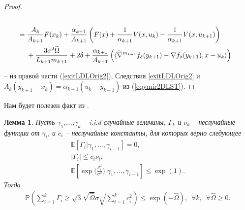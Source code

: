 \documentclass[11pt,a4]{article}
\newtheorem{lemma}{Лемма}
\newcommand\abs[1]{\left|#1\right|}
\newcommand*\circled[1]{\tikz[baseline=(char.base)]{
		\node[shape=circle,draw,inner sep=2pt] (char) {#1};}}
\begin{document}
\begin{proof}
\begin{align*}
	 \\&=
	 	 \frac{A_k}{A_{k+1}}F(x_k) + \frac{\alpha_{k+1}}{A_{k+1}}\left(F(x) + \frac{1}{\alpha_{k+1}}V(x, u_k) - \frac{1}{\alpha_{k+1}}V(x, u_{k+1})\right) \\&\hphantom{{}={}}+ \frac{3\sigma^2\widetilde{\Omega}}{L_{k+1}m_{k+1}} + 2\delta +\frac{\alpha_{k+1}}{A_{k+1}}\left(\langle \widetilde{\nabla}^{m_{k+1}} f_\delta(y_{k+1})-\nabla f_\delta(y_{k+1}), x - u_{k} \rangle\right)
\end{align*}

{\small \circled{1}} -- из правой части (\ref{exitLDLOrig2}), Следствия \ref{exitLDLOrig2} и $A_{k}(y_{k+1} - x_k) = \alpha_{k+1} (u_k - y_{k+1})$ из (\ref{eqymir2DLST}).

\end{proof}

Нам будет полезен факт из \cite{lan2012validation, devolder2013exactness}.
\begin{lemma}
\label{lemmaDev}
Пусть $\gamma_1$,...,$\gamma_k$ -- i.i.d случайные величины, $\Gamma_k$ и $\nu_k$ -- неслучайные функции от $\gamma_i$, и $c_i$ -- неслучайные константы, для которых верно следующее
\begin{gather*}
\mathbb{E}\left[\Gamma_i|\gamma_1,\dots,\gamma_{i-1}\right] = 0,\\
\abs{\Gamma_i} \leq c_i \nu_i,\\
\mathbb{E}\left[\exp\Bigg(\frac{\nu_i^2}{\sigma^2}\Bigg)\Bigg|\gamma_1,\dots,\gamma_{i-1}\right] \leq \exp(1).
\end{gather*}
Тогда
\begin{gather*}
\mathbb{P}\left(\sum_{i=1}^{k}\Gamma_i \geq \sqrt{3}\sqrt{\widehat{\Omega}}\sigma\sqrt{\sum_{i=1}^{k}c_i^2}\right) \leq \exp(-\widehat{\Omega}),\,\,\,\forall k,\,\,\,\forall \widehat{\Omega} \geq 0.
\end{gather*}
\end{lemma}
\end{document}
